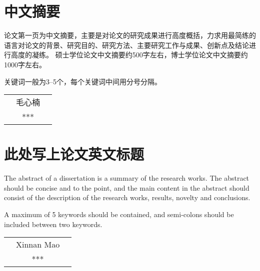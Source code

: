 \intobmk\chapter*{中文摘要}%
\setcounter{page}{1}%

论文第一页为中文摘要，主要是对论文的研究成果进行高度概括，力求用最简练的语言对论文的背景、研究目的、研究方法、主要研究工作与成果、创新点及结论进行高度的凝练。
硕士学位论文中文摘要约500字左右，博士学位论文中文摘要约1000字左右。

关键词一般为3--5个，每个关键词中间用分号分隔。


\vspace*{\baselineskip}\hfill{}{\begin{tabular}{rcc}%
	\makebox[5.5em][s]{作\hspace{\fill}者：} & 毛心楠 &\\
	\makebox[5.5em][s]{指\hspace{\fill}导\hspace{\fill}教\hspace{\fill}师：} & *** &
\end{tabular}}
\intobmk\chapter*{此处写上论文英文标题}%
\centerline{\bfseries{}}
\vspace*{18pt}%
{

The abstract of a dissertation is a summary of the research works.
The abstract should be concise and to the point, and the main content in the abstract should consist of the description of the research works, results, novelty and conclusions.

A maximum of 5 keywords should be contained, and semi-colons should be included between two keywords.


\vspace*{\baselineskip}\hfill{}\begin{tabular}{rcc}%
		\makebox[13.5ex][s]{Written\hspace{\fill}by:} & Xinnan Mao &\\
		\makebox[13.5ex][s]{Supervised\hspace{\fill}by:} & *** &
\end{tabular}
}
